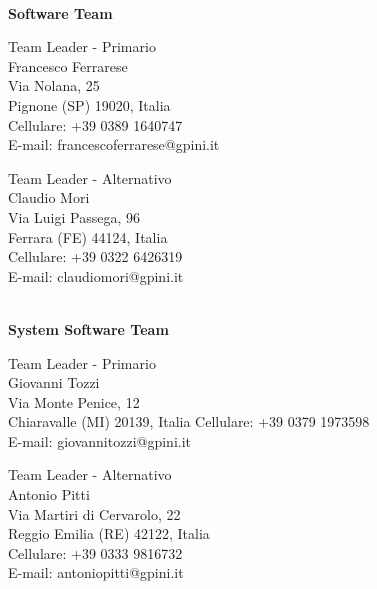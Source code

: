 \documentclass[12pt, a4paper, titlepage]{report}
\begin{document}
	\vspace{0.5cm}
	\centerline{\textbf{\\Software Team}}
	\begin{paracol}{2}
		\setlength{\columnsep}{5em}
		\begin{leftcolumn}
			\begin{adjustwidth}{0.5cm}{}
				Team Leader - Primario \\
				Francesco Ferrarese \\
				Via Nolana, 25\\ 
				Pignone (SP) 19020, Italia \\ 
				Cellulare:  +39 0389 1640747 \\
				E-mail:  francescoferrarese@gpini.it 
			\end{adjustwidth}
		\end{leftcolumn}
		\begin{rightcolumn}
			\begin{adjustwidth}{0.5cm}{}
				Team Leader - Alternativo \\
				Claudio Mori\\
				Via Luigi Passega, 96\\
				Ferrara (FE) 44124, Italia \\
				Cellulare:  +39 0322 6426319\\
				E-mail: claudiomori@gpini.it 
			\end{adjustwidth}
		\end{rightcolumn}
	\end{paracol} 
	
	\vspace{0.5cm}
	\centerline{\textbf{\\System Software Team}}
	\begin{paracol}{2}
		\setlength{\columnsep}{5em}
		\begin{leftcolumn}
			\begin{adjustwidth}{0.5cm}{}
				Team Leader - Primario \\
				Giovanni Tozzi \\
				Via Monte Penice, 12\\ 
				Chiaravalle (MI) 20139, Italia  
				Cellulare:  +39 0379 1973598 \\
				E-mail:  giovannitozzi@gpini.it 
			\end{adjustwidth}
		\end{leftcolumn}
		\begin{rightcolumn}
			\begin{adjustwidth}{0.5cm}{}
				Team Leader - Alternativo \\
				Antonio Pitti\\
				Via Martiri di Cervarolo, 22\\ 
				Reggio Emilia (RE) 42122, Italia \\
				Cellulare:  +39 0333 9816732 \\
				E-mail: antoniopitti@gpini.it 
			\end{adjustwidth}
		\end{rightcolumn}
	\end{paracol}
	
\end{document}
